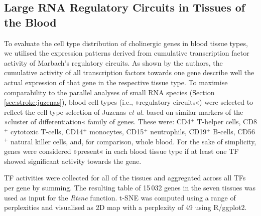 \begin{method}

\subsection{Large RNA Regulatory Circuits in Tissues of the Blood}
To evaluate the cell type distribution of cholinergic genes in blood tissue types, we utilised the expression patterns derived from cumulative transcription factor activity of Marbach's regulatory circuits.\cite{Marbach2016} As shown by the authors, the cumulative activity of all transcription factors towards one gene describe well the actual expression of that gene in the respective tissue type. To maximise comparability to the parallel analyses of small RNA species (Section \ref{sec:stroke:juzenas}), blood cell types (i.e., »regulatory circuits«) were selected to reflect the cell type selection of Juzenas \emph{et al.}\cite{Juzenas2017} based on similar markers of the »cluster of differentiation« family of genes. These were: CD4$^+$ T-helper cells, CD8$^+$ cytotoxic T-cells, CD14$^+$ monocytes, CD15$^+$ neutrophils, CD19$^+$ B-cells, CD56$^+$ natural killer cells, and, for comparison, whole blood. For the sake of simplicity, genes were considered »present« in each blood tissue type if at least one TF showed significant activity towards the gene.

TF activities were collected for all of the tissues and aggregated across all TFs per gene by summing. The resulting table of 15\,032 genes in the seven tissues was used as input for the \emph{Rtsne} function.\cite{Krijthe2015} t-SNE was computed using a range of perplexities and visualised as 2D map with a perplexity of 49 using R/ggplot2.\cite{Wickham2016}


\end{method}
